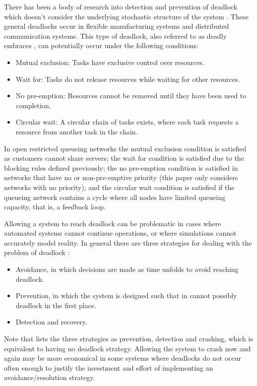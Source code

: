 \documentclass{article}
\numberwithin{equation}{section}
\begin{document}
There has been a body of research into detection and prevention of deadlock
which doesn't consider the underlying stochastic structure of the system
\cite{coffmanelphick71, reveliotis15a, reveliotis15b}.
These general deadlocks occur in flexible manufacturing systems and
distributed communication systems.
This type of deadlock, also referred to as deadly embraces
\cite{coffmanelphick71}, can potentially occur under the following conditions:
\begin{itemize}
  \item Mutual exclusion: Tasks have exclusive control over resources.
  \item Wait for: Tasks do not release resources while waiting for other
  resources.
  \item No pre-emption: Resources cannot be removed until they have been used
  to completion.
  \item Circular wait: A circular chain of tasks exists, where each task
  requests a resource from another task in the chain.
\end{itemize}

In open restricted queueing networks the mutual exclusion condition is
satisfied as customers cannot share servers; the wait for condition is
satisfied due to the blocking rules defined previously; the no pre-emption
condition is satisfied in networks that have no or non-pre-emptive priority
(this paper only considers networks with no priority); and the circular wait
condition is satisfied if the queueing network contains a cycle where all
nodes have limited queueing capacity, that is, a feedback loop.

Allowing a system to reach deadlock can be problematic in cases where
automated systems cannot continue operations, or where simulations cannot
accurately model reality.
In general there are three strategies for dealing with the problem of deadlock
\cite{kawadkaretal14, elmagarmid86, venkateshsmith05}:

\begin{itemize}
  \item Avoidance, in which decisions are made as time unfolds to avoid
  reaching deadlock.
  \item Prevention, in which the system is designed such that in cannot
  possibly deadlock in the first place.
  \item Detection and recovery.
\end{itemize}

Note that \cite{holt72} lists the three strategies as prevention, detection
and crashing, which is equivalent to having no deadlock strategy.
Allowing the system to crash now and again may be more economical in some
systems where deadlocks do not occur often enough to justify the investment
and effort of implementing an avoidance/resolution strategy.
\end{document}
